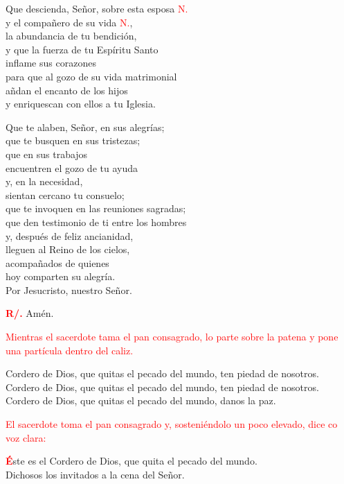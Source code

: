 \documentclass[12pt, letterpaper]{report}
\begin{document}
  Que descienda, Se\~nor, sobre esta esposa \textcolor{red}{N.}\\
  y el compa\~nero de su vida \textcolor{red}{N.},\\
  la abundancia de tu bendici\'on,\\
  y que la fuerza de tu Esp\'iritu Santo\\
  inflame sus corazones\\
  para que al gozo de su vida matrimonial\\
  a\~ndan el encanto de los hijos\\
  y enriquescan con ellos a tu Iglesia.

  Que te alaben, Se\~nor, en sus alegr\'ias;\\
  que te busquen en sus tristezas;\\
  que en sus trabajos\\
  encuentren el gozo de tu ayuda\\
  y, en la necesidad,\\
  sientan cercano tu consuelo;\\
  que te invoquen en las reuniones sagradas;\\
  que den testimonio de ti entre los hombres\\
  y, despu\'es de feliz ancianidad,\\
  lleguen al Reino de los cielos,\\
  acompa\~nados de quienes\\
  hoy comparten su alegr\'ia.\\
  Por Jesucristo, nuestro Se\~nor.

  \noindent
  \Large {\bfseries \textcolor{red}{R/.}} \hspace{0.5cm} Am\'en.

  \large{\textcolor{red}{Mientras el sacerdote tama el pan consagrado, lo parte sobre la patena y pone una part\'icula dentro del caliz.}}

  \Large Cordero de Dios, que quitas el pecado del mundo, ten piedad de nosotros.\\
  Cordero de Dios, que quitas el pecado del mundo, ten piedad de nosotros.\\
  Cordero de Dios, que quitas el pecado del mundo, danos la paz.

  \large{\textcolor{red}{El sacerdote toma el pan consagrado y, sosteni\'endolo un poco elevado, dice co voz clara:}}
  
  \Large \lettrine[lines=2]{\bfseries \textcolor{red}{É}}{}\Large ste es el Cordero de Dios, que quita el pecado del mundo.\\
  Dichosos los invitados a la cena del Se\~nor.
\end{document}

